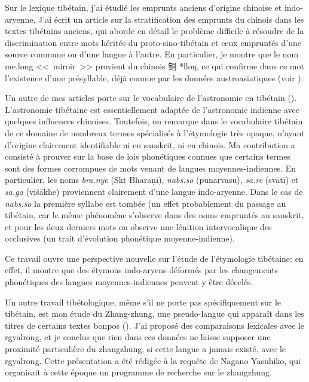 \documentclass[oldfontcommands,oneside,a4paper,11pt]{memoir}
\newcommand{\zh}[1]{{\cn #1}}
\begin{document}
Sur le lexique tibétain, j’ai étudié les emprunts anciens d’origine chinoise et indo-aryenne. J’ai écrit un article sur la stratification des emprunts du chinois dans les textes tibétains anciens, qui aborde en détail le problème difficile à résoudre de la discrimination entre mots hérités du proto-sino-tibétain et ceux empruntés d’une source commune ou d’une langue à l’autre. En particulier, je montre que le nom me.long <<~miroir~>> provient du chinois \zh{铜} *lloŋ, ce qui confirme dans ce mot l'existence d'une présyllable, déjà connue par les données austroasiatiques (voir \citealt{sagart99roc}). 


Un autre de mes articles porte sur le vocabulaire de l’astronomie en tibétain (\citealt{jacques07naksatram}). L’astronomie tibétaine est essentiellement adaptée de l’astronomie indienne avec quelques influences chinoises. Toutefois, on remarque dans le vocabulaire tibétain de ce domaine de nombreux termes spécialisés à l’étymologie très opaque, n’ayant d’origine clairement identifiable ni en sanskrit, ni en chinois. Ma contribution a consisté à prouver sur la base de lois phonétiques connues que certains termes sont des formes corrompues de mots venant de langues moyennes-indiennes. En particulier, les noms \textit{bra.nye} (Skt Bharaṇī), \textit{nabs.so} (punarvasu), \textit{sa.re} (svātī) et \textit{sa.ga} (viśākhe) proviennent clairement d'une langue indo-aryenne. Dans le cas de \textit{nabs.so} la première syllabe est tombée (un effet probablement du passage au tibétain, car le même phénomène s'observe dans des noms empruntés au sanskrit, et pour les deux derniers mots on observe une lénition intervocalique des occlusives (un trait d'évolution phonétique moyenne-indienne).

Ce travail ouvre une perspective nouvelle sur l'étude de l'étymologie tibétaine: en effet, il montre que des étymons indo-aryens déformés par les changements phonétiques des langues moyennes-indiennes peuvent y être décelés.

Un autre travail tibétologique, même s'il ne porte pas spécifiquement sur le tibétain, est mon étude du Zhang-zhung, une pseudo-langue qui apparaît dans les titres de certains textes bonpos (\citealt{jacques09zz}). J'ai proposé des comparaisons lexicales avec le rgyalrong, et je conclus que rien dans ces données ne laisse supposer une proximité particulière du zhangzhung, si cette langue a jamais existé, avec le rgyalrong. Cette présentation a été rédigée à la requête de Nagano Yasuhiko, qui organisait à cette époque un programme de recherche sur le zhangzhung.
\end{document}
